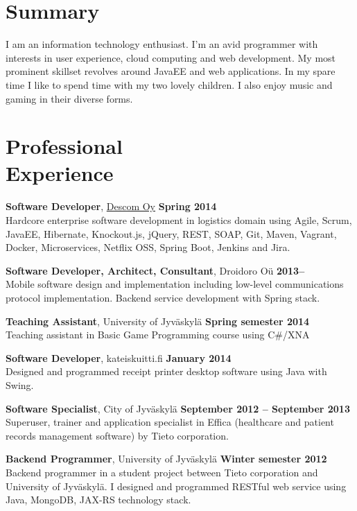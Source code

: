 \documentclass[margin,line]{resume}
\begin{document}
\begin{resume}

\vspace{0.5cm}

\section{\mysidestyle Summary}
I am an information technology enthusiast. I'm an avid programmer with interests in user experience, cloud computing and web development. My most prominent skillset revolves around JavaEE and web applications. In my spare time I like to spend time with my two lovely children. I also enjoy music and gaming in their diverse forms.

\section{\mysidestyle Professional\\Experience}

\textbf{Software Developer}, \href{http://www.descom.fi}{Descom Oy}
\hfill\textbf{Spring 2014}\\
Hardcore enterprise software development in logistics domain using Agile, Scrum, JavaEE, Hibernate, Knockout.js, jQuery, REST, SOAP, Git, Maven, Vagrant, Docker, Microservices, Netflix OSS, Spring Boot, Jenkins and Jira.

\textbf{Software Developer, Architect, Consultant}, Droidoro Oü
\hfill\textbf{2013--}\\
Mobile software design and implementation including low-level communications protocol implementation. Backend service development with Spring stack.


\textbf{Teaching Assistant}, University of Jyväskylä  
\hfill\textbf{Spring semester 2014} \\
Teaching assistant in Basic Game Programming course using C\#/XNA

\textbf{Software Developer}, kateiskuitti.fi
\hfill\textbf{January 2014} \\
Designed and programmed receipt printer desktop software using Java with Swing.

\textbf{Software Specialist}, City of Jyväskylä
\hfill\textbf{September 2012 -- September 2013}\\
Superuser, trainer and application specialist in Effica (healthcare and patient records management software) by Tieto corporation.

\textbf{Backend Programmer}, University of Jyväskylä 
\hfill\textbf{Winter semester 2012}\\
Backend programmer in a student project between Tieto corporation and University of Jyväskylä. I designed and programmed RESTful web service using Java, MongoDB, JAX-RS technology stack.
    

\end{resume}
\end{document}
